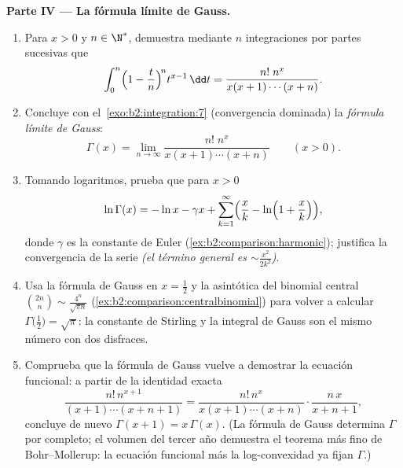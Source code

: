 \begin{problem}
\medskip
\noindent\textbf{Parte IV --- La fórmula límite de Gauss.}
\begin{enumerate}[resume]
  \item Para $x > 0$ y $n \in \N^*$, demuestra mediante $n$
        integraciones por partes sucesivas que
        \[
        \int_0^n \Bigl(1 - \frac tn\Bigr)^{\!n} t^{x-1}\,\dd t
        = \frac{n!\;n^x}{x(x+1)\cdots(x+n)} .
        \]
  \item Concluye con el~\cref{exo:b2:integration:7} (convergencia
        dominada) la \emph{fórmula límite de Gauss}:
        \[
        \Gamma(x) = \lim_{n\to\infty}
        \frac{n!\;n^x}{x(x+1)\cdots(x+n)}
        \qquad (x > 0).
        \]
  \item Tomando logaritmos, prueba que para $x > 0$
        \[
        \ln\Gamma(x) = -\ln x - \gamma x +
        \sum_{k=1}^{\infty}\Bigl(\frac xk -
        \ln\Bigl(1 + \frac xk\Bigr)\Bigr),
        \]
        donde $\gamma$ es la constante de Euler
        (\cref{ex:b2:comparison:harmonic}); justifica la
        convergencia de la serie \emph{(el término general es $\sim
        \frac{x^2}{2k^2}$)}.
  \item Usa la fórmula de Gauss en $x = \frac12$ y la asintótica del
        binomial central $\binom{2n}{n} \sim
        \frac{4^n}{\sqrt{\pi n}}$
        (\cref{ex:b2:comparison:centralbinomial}) para volver a
        calcular $\Gamma\bigl(\frac12\bigr) = \sqrt\pi$: la
        constante de Stirling y la integral de Gauss son el mismo
        número con dos disfraces.
  \item Comprueba que la fórmula de Gauss vuelve a demostrar la
        ecuación funcional: a partir de la identidad exacta
        \[
        \frac{n!\,n^{x+1}}{(x+1)\cdots(x+n+1)}
        = \frac{n!\,n^{x}}{x(x+1)\cdots(x+n)}\cdot
        \frac{n\,x}{x+n+1},
        \]
        concluye de nuevo $\Gamma(x+1) = x\,\Gamma(x)$. (La fórmula
        de Gauss determina $\Gamma$ por completo; el volumen del
        tercer año demuestra el teorema más fino de
        Bohr--Mollerup: la ecuación funcional más la log-convexidad
        ya fijan $\Gamma$.)
\end{enumerate}


\end{problem}
